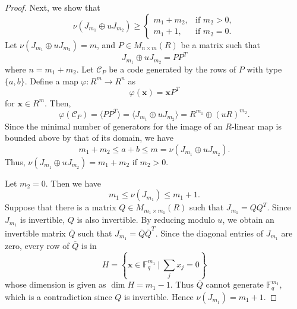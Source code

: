 \documentclass{article}
\theoremstyle{definition}
\theoremstyle{remark}
\begin{document}
\begin{proof}
Next, we show that
\[
\nu(J_{m_1}\oplus uJ_{m_2})\ge \begin{cases}
        m_1+m_2, & \mbox{if }m_2>0,\\
        m_1+1, & \mbox{if }m_2=0.
    \end{cases}
\]
Let $\nu(J_{m_1}\oplus uJ_{m_2})=m$, and $P\in M_{n\times m}(R)$ be a matrix such that
\[
J_{m_1}\oplus uJ_{m_2}=PP^T
\]
where $n=m_1+m_2$. Let $\mathcal{C}_P$ be a code generated by the rows of $P$ with type $\{a, b\}$. Define a map $\varphi:R^{m}\to R^n$ as
\[
\varphi(\mathbf{x})=\mathbf{x}P^T
\]
for $\mathbf{x}\in R^m$. Then,
\[
\varphi(\mathcal{C}_P)=\langle PP^T\rangle=\langle J_{m_1}\oplus uJ_{m_2}\rangle=R^{m_1}\oplus (uR)^{m_2}.
\]
Since the minimal number of generators for the image of an $R$-linear map is bounded above by that of its domain, we have
\[
m_1+m_2\le a+b\le m=\nu(J_{m_1}\oplus uJ_{m_2}).
\]
Thus, $\nu(J_{m_1}\oplus uJ_{m_2})=m_1+m_2$ if $m_2>0$.

Let $m_2=0$. Then we have
\[
m_1\le \nu(J_{m_1})\le m_1+1.
\]
Suppose that there is a matrix $Q\in M_{m_1\times m_1}(R)$ such that $J_{m_1}=QQ^T$. Since $J_{m_1}$ is invertible, $Q$ is also invertible. By reducing modulo $u$, we obtain an invertible matrix $\overline{Q}$ such that $\overline{J_{m_1}}=\overline{Q}\overline{Q}^T$. Since the diagonal entries of $J_{m_1}$ are zero, every row of $\overline{Q}$ is in
\[
H=\left\{\mathbf{x}\in \mathbb{F}_q^{m_1}~|~\sum_jx_j=0\right\}
\]
whose dimension is given as $\dim H=m_1-1$. Thus $\overline{Q}$ cannot generate $\mathbb{F}_q^{m_1}$, which is a contradiction since $Q$ is invertible. Hence $\nu(J_{m_1})=m_1+1$.
\end{proof}
\end{document}
